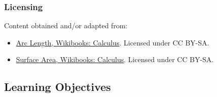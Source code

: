\subsubsection{Licensing}
\label{sss:lice-7352}

Content obtained and/or adapted from:

\begin{itemize}

\item \href{https://en.wikibooks.org/wiki/Calculus/Arc_length}{Arc Length, Wikibooks: Calculus}.  
Licensed under CC BY-SA.

\item \href{https://en.wikibooks.org/wiki/Calculus/Surface_area}{Surface Area, Wikibooks: Calculus}.  
Licensed under CC BY-SA.

\end{itemize}

\subsection{Learning Objectives}

